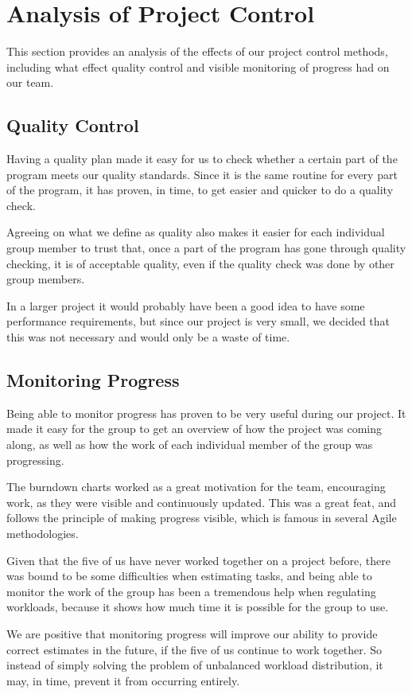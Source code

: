 \section{Analysis of Project Control}
This section provides an analysis of the effects of our project control methods,
including what effect quality control and visible monitoring of progress had on
our team.

\subsection{Quality Control}
\label{sec:AnalysisQualityControl}
Having a quality plan made it easy for us to check whether a certain part of the
program meets our quality standards. Since it is the same routine for every part
of the program, it has proven, in time, to get easier and quicker to do a quality
check.

Agreeing on what we define as quality also makes it easier for each individual
group member to trust that, once a part of the program has gone through quality
checking, it is of acceptable quality, even if the quality check was done by
other group members.

In a larger project it would probably have been a good idea to have some
performance requirements, but since our project is very small, we decided that
this was not necessary and would only be a waste of time.

\subsection{Monitoring Progress}
\label{sec:AnalysisProgress}
Being able to monitor progress has proven to be very useful during our project. It
made it easy for the group to get an overview of how the project was coming along,
as well as how the work of each individual member of the group was progressing.

The burndown charts worked as a great motivation for the team, encouraging work, as
they were visible and continuously updated. This was a great feat, and follows the
principle of making progress visible\cite{xpe}, which is famous in several Agile
methodologies.

Given that the five of us have never worked together on a project before, there was
bound to be some difficulties when estimating tasks, and being able to monitor the
work of the group has been a tremendous help when regulating workloads,
because it shows how much time it is possible for the group to use.

We are positive that monitoring progress will improve our ability to provide correct
estimates in the future, if the five of us continue to work together. So instead of
simply solving the problem of unbalanced workload distribution, it may, in time, prevent
it from occurring entirely.
